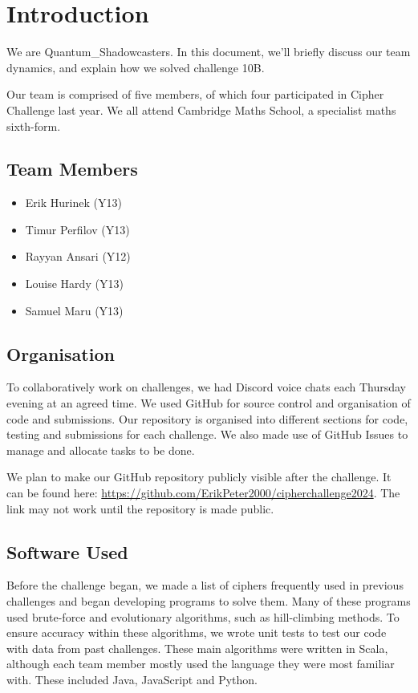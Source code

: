
\section*{Introduction}

We are Quantum\_Shadowcasters. In this document, we'll briefly discuss our team dynamics, and explain how we solved challenge 10B. %

Our team is comprised of five members, of which four participated in Cipher Challenge last year. We all attend Cambridge Maths School, a specialist maths sixth-form.

\subsection*{Team Members}

\begin{itemize}
    \item Erik Hurinek (Y13)
    \item Timur Perfilov (Y13)
    \item Rayyan Ansari (Y12)
    \item Louise Hardy (Y13)
    \item Samuel Maru (Y13)
\end{itemize}

\subsection*{Organisation}

To collaboratively work on challenges, we had Discord voice chats each Thursday evening at an agreed time. We used GitHub for source control and organisation of code and submissions. Our repository is organised into different sections for code, testing and submissions for each challenge. We also made use of GitHub Issues to manage and allocate tasks to be done.

We plan to make our GitHub repository publicly visible after the challenge. It can be found here: \url{https://github.com/ErikPeter2000/cipherchallenge2024}. The link may not work until the repository is made public.

\subsection*{Software Used}

Before the challenge began, we made a list of ciphers frequently used in previous challenges and began developing programs to solve them. Many of these programs used brute-force and evolutionary algorithms, such as hill-climbing methods. To ensure accuracy within these algorithms, we wrote unit tests to test our code with data from past challenges. These main algorithms were written in Scala, although each team member mostly used the language they were most familiar with. These included Java, JavaScript and Python.